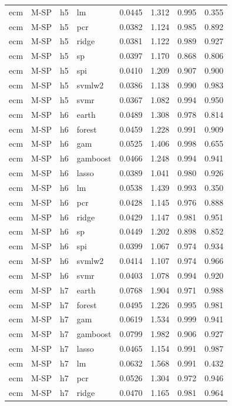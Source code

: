 \begin{ThreePartTable}
\begin{longtable}[t]{llclcccc}
ecm & M-SP & h5 & lm & 0.0445 & 1.312 & 0.995 & 0.355\\
ecm & M-SP & h5 & pcr & 0.0382 & 1.124 & 0.985 & 0.892\\
ecm & M-SP & h5 & ridge & 0.0381 & 1.122 & 0.989 & 0.927\\
ecm & M-SP & h5 & sp & 0.0397 & 1.170 & 0.868 & 0.806\\
ecm & M-SP & h5 & spi & 0.0410 & 1.209 & 0.907 & 0.900\\
ecm & M-SP & h5 & svmlw2 & 0.0386 & 1.138 & 0.990 & 0.983\\
ecm & M-SP & h5 & svmr & 0.0367 & 1.082 & 0.994 & 0.950\\
\addlinespace
ecm & M-SP & h6 & earth & 0.0489 & 1.308 & 0.978 & 0.814\\
ecm & M-SP & h6 & forest & 0.0459 & 1.228 & 0.991 & 0.909\\
ecm & M-SP & h6 & gam & 0.0525 & 1.406 & 0.998 & 0.655\\
ecm & M-SP & h6 & gamboost & 0.0466 & 1.248 & 0.994 & 0.941\\
ecm & M-SP & h6 & lasso & 0.0389 & 1.041 & 0.980 & 0.926\\
ecm & M-SP & h6 & lm & 0.0538 & 1.439 & 0.993 & 0.350\\
ecm & M-SP & h6 & pcr & 0.0428 & 1.145 & 0.976 & 0.888\\
ecm & M-SP & h6 & ridge & 0.0429 & 1.147 & 0.981 & 0.951\\
ecm & M-SP & h6 & sp & 0.0449 & 1.202 & 0.898 & 0.852\\
ecm & M-SP & h6 & spi & 0.0399 & 1.067 & 0.974 & 0.934\\
ecm & M-SP & h6 & svmlw2 & 0.0414 & 1.107 & 0.974 & 0.966\\
ecm & M-SP & h6 & svmr & 0.0403 & 1.078 & 0.994 & 0.920\\
\addlinespace
ecm & M-SP & h7 & earth & 0.0768 & 1.904 & 0.971 & 0.988\\
ecm & M-SP & h7 & forest & 0.0495 & 1.226 & 0.995 & 0.981\\
ecm & M-SP & h7 & gam & 0.0619 & 1.534 & 0.999 & 0.941\\
ecm & M-SP & h7 & gamboost & 0.0799 & 1.982 & 0.906 & 0.927\\
ecm & M-SP & h7 & lasso & 0.0465 & 1.154 & 0.991 & 0.987\\
ecm & M-SP & h7 & lm & 0.0632 & 1.568 & 0.991 & 0.432\\
ecm & M-SP & h7 & pcr & 0.0526 & 1.304 & 0.972 & 0.946\\
ecm & M-SP & h7 & ridge & 0.0470 & 1.165 & 0.981 & 0.964\\

\end{longtable}
\end{ThreePartTable}
